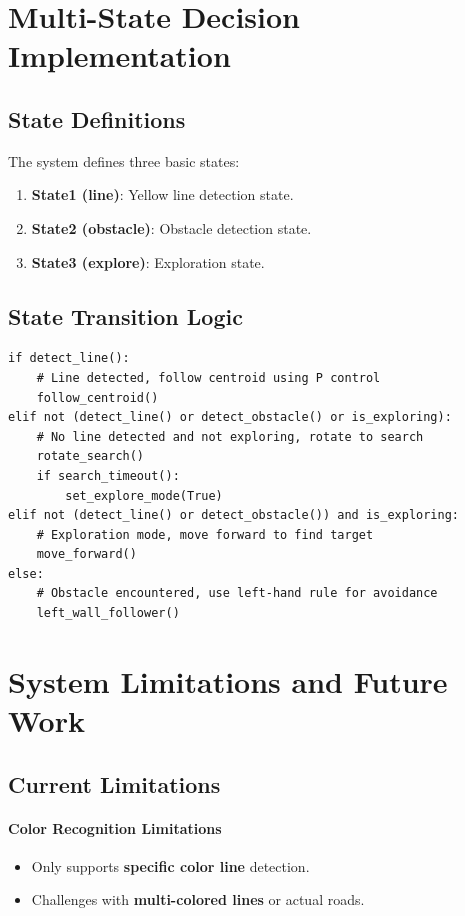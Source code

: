 \documentclass[12pt,a4paper]{article}
\begin{document}
\section{Multi-State Decision Implementation}

\subsection{State Definitions}

The system defines three basic states:

\begin{enumerate}
  \item \textbf{State1 (line)}: Yellow line detection state.
  \item \textbf{State2 (obstacle)}: Obstacle detection state.
  \item \textbf{State3 (explore)}: Exploration state.
\end{enumerate}

\subsection{State Transition Logic}

\begin{lstlisting}
if detect_line():
    # Line detected, follow centroid using P control
    follow_centroid()
elif not (detect_line() or detect_obstacle() or is_exploring):
    # No line detected and not exploring, rotate to search
    rotate_search()
    if search_timeout():
        set_explore_mode(True)
elif not (detect_line() or detect_obstacle()) and is_exploring:
    # Exploration mode, move forward to find target
    move_forward()
else:
    # Obstacle encountered, use left-hand rule for avoidance
    left_wall_follower()
\end{lstlisting}

\section{System Limitations and Future Work}

\subsection{Current Limitations}

\paragraph{Color Recognition Limitations}
\begin{itemize}
  \item Only supports \textbf{specific color line} detection.
  \item Challenges with \textbf{multi-colored lines} or actual roads.
\end{itemize}
\end{document}
